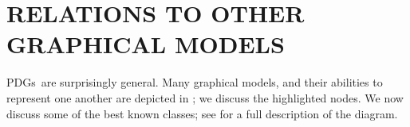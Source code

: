 \documentclass{article}
\newcommand{\MN}{PDG}
\newcommand{\MNs}{\MN s}
\numberwithin{equation}{section}
\begin{document}
	\section{RELATIONS TO OTHER GRAPHICAL MODELS}\label{sec:other-graphical-models}
	
	\MNs\ are surprisingly general. Many graphical models, and their abilities to represent one another are depicted in ; we discuss the highlighted nodes. We now discuss some of the best known classes; see  for a full description of the diagram.
\end{document}
